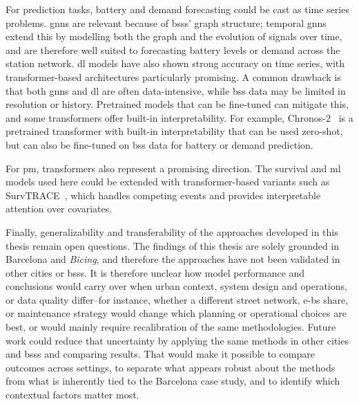 For prediction tasks, battery and demand forecasting could be cast as time series problems. \acp{gnn} are relevant because of \acp{bss}' graph structure; temporal \acp{gnn} extend this by modelling both the graph and the evolution of signals over time, and are therefore well suited to forecasting battery levels or demand across the station network. \ac{dl} models have also shown strong accuracy on time series, with transformer-based architectures particularly promising. A common drawback is that both \acp{gnn} and \ac{dl} are often data-intensive, while \ac{bss} data may be limited in resolution or history. Pretrained models that can be fine-tuned can mitigate this, and some transformers offer built-in interpretability. For example, Chronos-2~\cite{Ansari2025Chronos2} is a pretrained transformer with built-in interpretability that can be used zero-shot, but can also be fine-tuned on \ac{bss} data for battery or demand prediction.

For \ac{pm}, transformers also represent a promising direction. The survival and \ac{ml} models used here could be extended with transformer-based variants such as SurvTRACE~\cite{Wang2022SurvTRACE}, which handles competing events and provides interpretable attention over covariates.

Finally, generalizability and transferability of the approaches developed in this thesis remain open questions. The findings of this thesis are solely grounded in Barcelona and \textit{Bicing}, and therefore the approaches have not been validated in other cities or \acp{bss}. It is therefore unclear how model performance and conclusions would carry over when urban context, system design and operations, or data quality differ--for instance, whether a different street network, \acp{e-b} share, or maintenance strategy would change which planning or operational choices are best, or would mainly require recalibration of the same methodologies. Future work could reduce that uncertainty by applying the same methods in other cities and \acp{bss} and comparing results. That would make it possible to compare outcomes across settings, to separate what appears robust about the methods from what is inherently tied to the Barcelona case study, and to identify which contextual factors matter most.